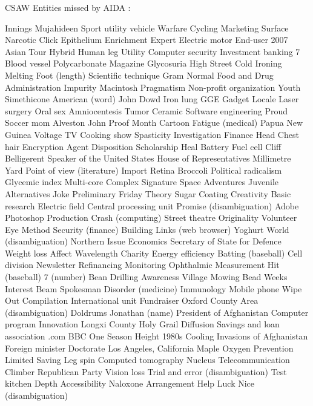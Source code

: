 CSAW Entities missed by AIDA : 
  
Innings  Mujahideen  Sport utility vehicle  
Warfare  Cycling  Marketing  
Surface  Narcotic  Click  
Epithelium  Enrichment  Expert  
Electric motor  End-user  2007 Asian Tour  
Hybrid  Human leg  Utility  
Computer security  Investment banking  7  
Blood vessel  Polycarbonate  Magazine  
Glycosuria  High Street  Cold Ironing  
Melting  Foot (length)  Scientific technique  
Gram  Normal  Food and Drug Administration  
Impurity  Macintosh  Pragmatism  
Non-profit organization  Youth  Simethicone  
American (word)  John Dowd  Iron lung  
GGE  Gadget  Locale  
Laser surgery  Oral sex  Amniocentesis  
Tumor  Ceramic  Software engineering  
Proud  Soccer mom  Alveston  
John  Proof  Month  
Cartoon  Fatigue (medical)  Papua New Guinea  
Voltage  TV Cooking show  Spasticity  
Investigation  Finance  Head  
Chest hair  Encryption  Agent  
Disposition  Scholarship  Heal  
Battery  Fuel cell  Cliff  
Belligerent  Speaker of the United States House of Representatives  Millimetre  
Yard  Point of view (literature)  Import  
Retina  Broccoli  Political radicalism  
Glycemic index  Multi-core  Complex  
Signature  Space Adventures  Juvenile  
Alternatives  Joke  Preliminary  
Friday  Theory  Sugar  
Coating  Creativity  Basic research  
Electric field  Central processing unit  Promise (disambiguation)  
Adobe Photoshop  Production  Crash (computing)  
Street theatre  Originality  Volunteer  
Eye  Method  Security (finance)  
Building  Links (web browser)  Yoghurt  
World (disambiguation)  Northern  Issue  
Economics  Secretary of State for Defence  Weight loss  
Affect  Wavelength  Charity  
Energy efficiency  Batting (baseball)  Cell division  
Newsletter  Refinancing  Monitoring  
Ophthalmic  Measurement  Hit (baseball)  
7 (number)  Bean  Drilling  
Awareness  Village  Mowing  
Bead  Weeks  Interest  
Beam  Spokesman  Disorder (medicine)  
Immunology  Mobile phone  Wipe Out  
Compilation  International unit  Fundraiser  
Oxford County  Area (disambiguation)  Doldrums  
Jonathan (name)  President of Afghanistan  Computer program  
Innovation  Longxi County  Holy Grail  
Diffusion  Savings and loan association  .com  
BBC One  Season  Height  
1980s  Cooling  Invasions of Afghanistan  
Foreign minister  Doctorate  Los Angeles, California  
Maple  Oxygen  Prevention  
Limited  Saving  Leg spin  
Computed tomography  Nucleus  Telecommunication  
Climber  Republican Party  Vision loss  
Trial and error (disambiguation)  Test kitchen  Depth  
Accessibility  Naloxone  Arrangement  
Help  Luck  Nice (disambiguation)  
